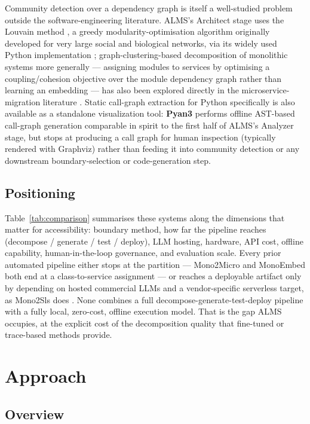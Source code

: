 \documentclass[conference]{IEEEtran}
\begin{document}
Community detection over a dependency graph is itself a well-studied problem outside the software-engineering literature. ALMS's Architect stage uses the Louvain method \cite{blondel2008}, a greedy modularity-optimisation algorithm originally developed for very large social and biological networks, via its widely used Python implementation \cite{aynaud2020}; graph-clustering-based decomposition of monolithic systems more generally --- assigning modules to services by optimising a coupling/cohesion objective over the module dependency graph rather than learning an embedding --- has also been explored directly in the microservice-migration literature \cite{filippone2023}. Static call-graph extraction for Python specifically is also available as a standalone visualization tool: \textbf{Pyan3} \cite{pyan2024} performs offline AST-based call-graph generation comparable in spirit to the first half of ALMS's Analyzer stage, but stops at producing a call graph for human inspection (typically rendered with Graphviz) rather than feeding it into community detection or any downstream boundary-selection or code-generation step.

\subsection{Positioning}

Table~\ref{tab:comparison} summarises these systems along the dimensions that matter for accessibility: boundary method, how far the pipeline reaches (decompose / generate / test / deploy), LLM hosting, hardware, API cost, offline capability, human-in-the-loop governance, and evaluation scale. Every prior automated pipeline either stops at the partition --- Mono2Micro \cite{kalia2021} and MonoEmbed \cite{sellami2025} both end at a class-to-service assignment --- or reaches a deployable artifact only by depending on hosted commercial LLMs and a vendor-specific serverless target, as Mono2Sls does \cite{chen2026}. None combines a full decompose-generate-test-deploy pipeline with a fully local, zero-cost, offline execution model. That is the gap ALMS occupies, at the explicit cost of the decomposition quality that fine-tuned or trace-based methods provide.

\section{Approach}

\subsection{Overview}
\end{document}
